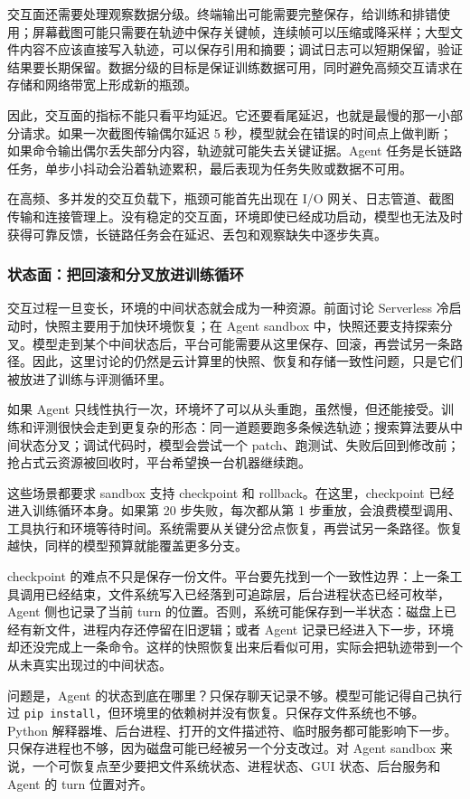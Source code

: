 交互面还需要处理观察数据分级。终端输出可能需要完整保存，给训练和排错使用；屏幕截图可能只需要在轨迹中保存关键帧，连续帧可以压缩或降采样；大型文件内容不应该直接写入轨迹，可以保存引用和摘要；调试日志可以短期保留，验证结果要长期保留。数据分级的目标是保证训练数据可用，同时避免高频交互请求在存储和网络带宽上形成新的瓶颈。

因此，交互面的指标不能只看平均延迟。它还要看尾延迟，也就是最慢的那一小部分请求。如果一次截图传输偶尔延迟 5 秒，模型就会在错误的时间点上做判断；如果命令输出偶尔丢失部分内容，轨迹就可能失去关键证据。Agent 任务是长链路任务，单步小抖动会沿着轨迹累积，最后表现为任务失败或数据不可用。

在高频、多并发的交互负载下，瓶颈可能首先出现在 I/O 网关、日志管道、截图传输和连接管理上。没有稳定的交互面，环境即使已经成功启动，模型也无法及时获得可靠反馈，长链路任务会在延迟、丢包和观察缺失中逐步失真。

\subsubsection{状态面：把回滚和分叉放进训练循环}
\label{sec6:agent-state-plane}

交互过程一旦变长，环境的中间状态就会成为一种资源。前面讨论 Serverless 冷启动时，快照主要用于加快环境恢复；在 Agent sandbox 中，快照还要支持探索分叉。模型走到某个中间状态后，平台可能需要从这里保存、回滚，再尝试另一条路径。因此，这里讨论的仍然是云计算里的快照、恢复和存储一致性问题，只是它们被放进了训练与评测循环里。

如果 Agent 只线性执行一次，环境坏了可以从头重跑，虽然慢，但还能接受。训练和评测很快会走到更复杂的形态：同一道题要跑多条候选轨迹；搜索算法要从中间状态分叉；调试代码时，模型会尝试一个 patch、跑测试、失败后回到修改前；抢占式云资源被回收时，平台希望换一台机器继续跑。

这些场景都要求 sandbox 支持 checkpoint 和 rollback。在这里，checkpoint 已经进入训练循环本身。如果第 20 步失败，每次都从第 1 步重放，会浪费模型调用、工具执行和环境等待时间。系统需要从关键分岔点恢复，再尝试另一条路径。恢复越快，同样的模型预算就能覆盖更多分支。

checkpoint 的难点不只是保存一份文件。平台要先找到一个一致性边界：上一条工具调用已经结束，文件系统写入已经落到可追踪层，后台进程状态已经可枚举，Agent 侧也记录了当前 turn 的位置。否则，系统可能保存到一半状态：磁盘上已经有新文件，进程内存还停留在旧逻辑；或者 Agent 记录已经进入下一步，环境却还没完成上一条命令。这样的快照恢复出来后看似可用，实际会把轨迹带到一个从未真实出现过的中间状态。

问题是，Agent 的状态到底在哪里？只保存聊天记录不够。模型可能记得自己执行过 \texttt{pip install}，但环境里的依赖树并没有恢复。只保存文件系统也不够。Python 解释器堆、后台进程、打开的文件描述符、临时服务都可能影响下一步。只保存进程也不够，因为磁盘可能已经被另一个分支改过。对 Agent sandbox 来说，一个可恢复点至少要把文件系统状态、进程状态、GUI 状态、后台服务和 Agent 的 turn 位置对齐。

